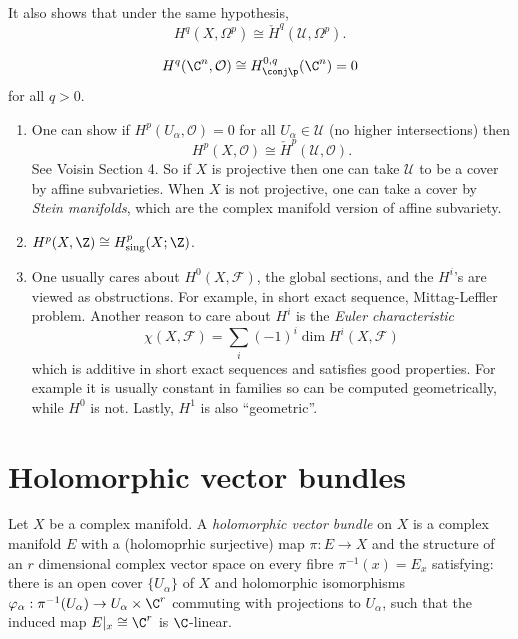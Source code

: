 \documentclass[a4paper]{article}
\begin{document}
\begin{remark}
  It also shows that under the same hypothesis,
  \[
    H^q(X, \Omega^p) \cong \check H^q(\mathcal U, \Omega^p).
  \]
\end{remark}

\begin{eg}
  \[
    H^q(\C^n, \mathcal O) \cong H_{\conj \p}^{0, q}(\C^n) = 0
  \]
  for all \(q > 0\).
\end{eg}

\begin{remark}\leavevmode
  \begin{enumerate}
  \item One can show if \(H^p(U_\alpha, \mathcal O) = 0\) for all \(U_\alpha \in \mathcal U\) (no higher intersections) then
    \[
      H^p(X, \mathcal O) \cong \check H^p(\mathcal U, \mathcal O).
    \]
    See Voisin Section 4. So if \(X\) is projective then one can take \(\mathcal U\) to be a cover by affine subvarieties. When \(X\) is not projective, one can take a cover by \emph{Stein manifolds}, which are the complex manifold version of affine subvariety.
  \item \(H^p(X, \Z) \cong H^p_{\text{sing}}(X; \Z)\).
  \item One usually cares about \(H^0(X, \mathcal F)\), the global sections, and the \(H^i\)'s are viewed as obstructions. For example, in short exact sequence, Mittag-Leffler problem. Another reason to care about \(H^i\) is the \emph{Euler characteristic}
    \[
      \chi(X, \mathcal F) = \sum_i (-1)^i \dim H^i(X, \mathcal F)
    \]
    which is additive in short exact sequences and satisfies good properties. For example it is usually constant in families so can be computed geometrically, while \(H^0\) is not. Lastly, \(H^1\) is also ``geometric''.
  \end{enumerate}
\end{remark}

\section{Holomorphic vector bundles}

\begin{definition}
  Let \(X\) be a complex manifold. A \emph{holomorphic vector bundle} on \(X\) is a complex manifold \(E\) with a (holomoprhic surjective) map \(\pi: E \to X\) and the structure of an \(r\) dimensional complex vector space on every fibre \(\pi^{-1}(x) = E_x\) satisfying: there is an open cover \(\{U_\alpha\}\) of \(X\) and holomorphic isomorphisms \(\varphi_\alpha: \pi^{-1}(U_\alpha) \to U_\alpha \times \C^r\) commuting with projections to \(U_\alpha\), such that the induced map \(E|_x \cong \C^r\) is \(\C\)-linear.
\end{definition}
\end{document}

